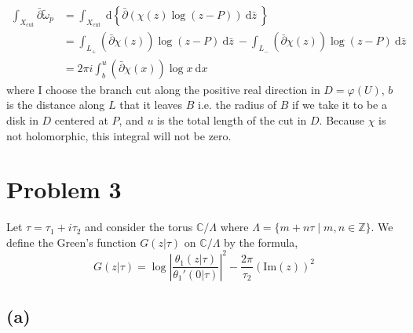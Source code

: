 \documentclass[12pt]{extarticle}
\newcommand{\Z}{\mathbb{Z}}
\newcommand{\C}{\mathbb{C}}
\renewcommand{\Im}[1]{\mathrm{Im}(#1)}
\renewcommand{\d}[1]{\: \mathrm{d}#1 \:}
\theoremstyle{definition}
\begin{document}
\begin{align*}
\int_{X_{\text{cut}}} \bar{\partial} \tilde{\omega}_{p} & = \int_{X_{\text{cut}}} \d{ \left\{ \bar{\partial} \left( \chi(z) \log{(z - P)} \right) \d{\bar{z}} \right\} }
\\
& = \int_{L_+} (\bar{\partial} \chi(z)) \log{(z - P)} \d{\bar{z}} - \int_{L_{-}} (\bar{\partial} \chi(z)) \log{(z - P)} \d{\bar{z}} 
\\
& = 2 \pi i \int_{b}^{u} (\bar{\partial} \chi(x)) \log{x} \d{x} 
\end{align*}
where I choose the branch cut along the positive real direction in $D = \varphi(U)$, $b$ is the distance along $L$ that it leaves $B$ i.e. the radius of $B$ if we take it to be a disk in $D$ centered at $P$, and $u$ is the total length of the cut in $D$. Because $\chi$ is not holomorphic, this integral will not be zero. 

\section*{Problem 3}

Let $\tau = \tau_1 + i \tau_2$ and consider the torus $\C / \Lambda$ where $\Lambda = \{m + n \tau \mid m,n \in \Z \}$. We define the Green's function $G(z|\tau)$ on $\C / \Lambda$ by the formula,
\[ G(z | \tau) = \log{\left| \frac{\theta_1(z | \tau)}{\theta_1'(0 | \tau)} \right|^2} - \frac{2 \pi}{\tau_2} \left( \Im{z} \right)^2 \] 

\subsection*{(a)}
\end{document}
